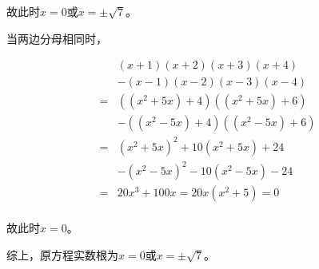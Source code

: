 故此时$x = 0$或$x = \pm\sqrt7$。

当两边分母相同时，

\begin{align*}
  & (x + 1)(x + 2)(x + 3)(x + 4) \\
  &- (x - 1)(x - 2)(x - 3)(x - 4) \\
  ={}& ((x^2 + 5x) + 4)((x^2 + 5x) + 6) \\
  &- ((x^2 - 5x) + 4)((x^2 - 5x) + 6) \\
  ={}& (x^2 + 5x)^2 + 10(x^2 + 5x) + 24 \\
  &- (x^2 - 5x)^2 - 10(x^2 - 5x) - 24 \\
  ={}& 20x^3 + 100x = 20x(x^2 + 5) = 0 \\
\end{align*}

故此时$x = 0$。

综上，原方程实数根为$x = 0$或$x = \pm\sqrt7$。
